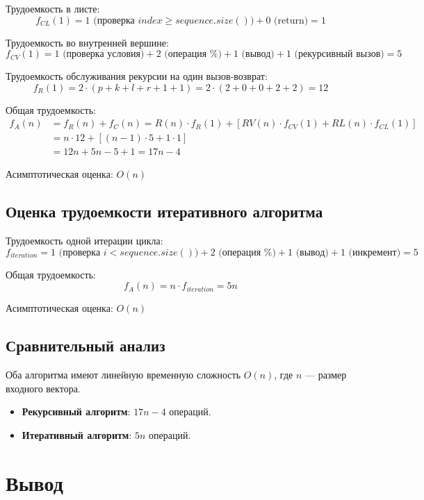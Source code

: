 Трудоемкость в листе:
\[
f_{CL}(1) = 1 \text{ (проверка } index \geq sequence.size()) + 0 \text{ (return)} = 1
\]

Трудоемкость во внутренней вершине:
\[
f_{CV}(1) = 1 \text{ (проверка условия)} + 2 \text{ (операция \%)} + 1 \text{ (вывод)} + 1 \text{ (рекурсивный вызов)} = 5
\]

Трудоемкость обслуживания рекурсии на один вызов-возврат:
\[
f_R(1) = 2 \cdot (p + k + l + r + 1 + 1) = 2 \cdot (2 + 0 + 0 + 2 + 2) = 12
\]

Общая трудоемкость:
\begin{align*}
	f_A(n) &= f_R(n) + f_C(n) = R(n) \cdot f_R(1) + [RV(n) \cdot f_{CV}(1) + RL(n) \cdot f_{CL}(1)] \\
	&= n \cdot 12 + [(n - 1) \cdot 5 + 1 \cdot 1] \\
	&= 12n + 5n - 5 + 1 = 17n - 4
\end{align*}

Асимптотическая оценка: $O(n)$

\subsection{Оценка трудоемкости итеративного алгоритма}

Трудоемкость одной итерации цикла:
\[
f_{iteration} = 1 \text{ (проверка } i < sequence.size()) + 2 \text{ (операция \%)} + 1 \text{ (вывод)} + 1 \text{ (инкремент)} = 5
\]

Общая трудоемкость:
\[
f_A(n) = n \cdot f_{iteration} = 5n
\]

Асимптотическая оценка: $O(n)$

\subsection{Сравнительный анализ}

Оба алгоритма имеют линейную временную сложность $O(n)$, где $n$ — размер входного вектора.

\begin{itemize}
	\item \textbf{Рекурсивный алгоритм}: $17n - 4$ операций.
	\item \textbf{Итеративный алгоритм}: $5n$ операций.
\end{itemize}

\section*{Вывод}

